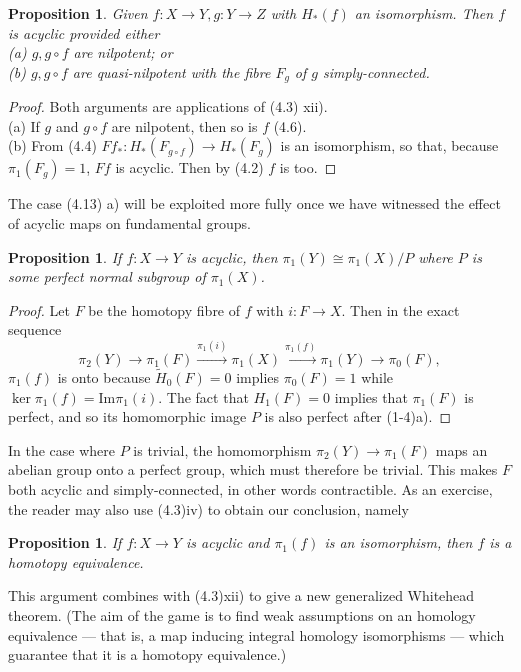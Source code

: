 \documentclass[openany,leqno]{book}  %
\newcommand{\ima}{\mathrm{Im}}
\newtheorem{prop}[theorem]{Proposition}
\begin{document}
\begin{prop}
	Given $f\colon  X\longrightarrow Y, g\colon   Y\longrightarrow Z$ with $H_*(f)$ an isomorphism. Then $f$ is acyclic provided either\\
(a) $g, g\circ f$ are nilpotent; or\\
(b) $g, g\circ f$ are quasi-nilpotent with the fibre $F_g$ of $g$ simply-connected.
\end{prop}
\begin{proof}
Both arguments are applications of (4.3) xii). \\
(a) If $g$ and $g\circ f$ are nilpotent, then so is $f$ (4.6). \\
(b) From (4.4) $Ff_* \colon   H_*(F_{g\circ f})\longrightarrow H_*(F_g)$ is an isomorphism, so that, because $\pi_1 (F_g) = 1$, $Ff$ is acyclic. Then by (4.2) $f$ is too.
\end{proof}
The case (4.13) a) will be exploited more fully once we have witnessed the effect of acyclic maps on fundamental groups.
\begin{prop}
 	If $f\colon  X\longrightarrow Y$ is acyclic, then $\pi_1(Y) \cong \pi_1(X)/P$ where $P$ is some perfect normal subgroup of $\pi_1(X)$.
 \end{prop} 
\begin{proof}
Let $F$ be the homotopy fibre of $f$ with $i\colon  F\longrightarrow X$. Then in the exact sequence
\[\pi_2(Y)\longrightarrow \pi_1(F)\overset{\pi_1(i)}\longrightarrow \pi_1(X) \overset{\pi_1(f)}\longrightarrow \pi_1(Y)\longrightarrow \pi_0(F),\]
 $\pi_1(f)$ is onto because $\widetilde{H}_0(F) = 0$ implies $\pi_0(F) = 1$ while $\ker\pi_1(f) = \ima \pi_1(i)$. The fact that
$H_1(F) =0$ implies that $\pi_1(F)$ is perfect, and so its homomorphic image $P$ is also perfect after (1-4)a).
\end{proof}

In the case where $P$ is trivial, the homomorphism $\pi_2(Y)\longrightarrow \pi_1(F)$ maps an abelian group onto a perfect group, which must therefore be trivial. This makes $F$ both acyclic and simply-connected, in other words contractible. As an exercise, the reader may also use (4.3)iv) to obtain our conclusion, namely
\begin{prop}
 	If $f\colon  X\longrightarrow Y$ is acyclic and $\pi_1(f)$ is an isomorphism, then $f$ is a homotopy equivalence.
 \end{prop} 

This argument combines with (4.3)xii) to give a new generalized Whitehead theorem. (The aim of the game is to find weak assumptions on an homology equivalence --- that is, a map inducing integral homology isomorphisms --- which guarantee that it is a homotopy equivalence.)
\end{document}
